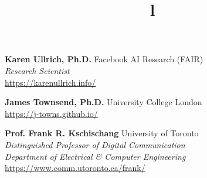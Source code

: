 \documentclass[margin, line]{res}
\begin{document}
\begin{resume}
\textbf{Karen Ullrich, Ph.D.} \hfill Facebook AI Research (FAIR)\\
{\sl Research Scientist}\\
\url{https://karenullrich.info/}

\textbf{James Townsend, Ph.D.} \hfill University College London\\
\url{https://j-towns.github.io/}

\textbf{Prof. Frank R. Kschischang} \hfill University of Toronto\\
{\sl Distinguished Professor of Digital Communication}\\
{\sl Department of Electrical \& Computer Engineering}\\
\url{https://www.comm.utoronto.ca/frank/}

\begin{format}
\title{l}\\
\\
\body\\
\end{format}

\end{resume}
\(\)
\end{document}
